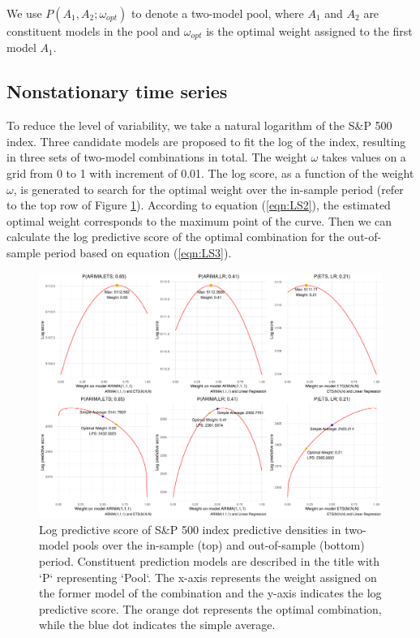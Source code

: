 \documentclass{monashthesis}
\begin{document}
We use \(P(A_1, A_2; \omega_{opt})\) to denote a two-model pool, where \(A_1\) and \(A_2\) are constituent models in the pool and \(\omega_{opt}\) is the optimal weight assigned to the first model \(A_1\).

\subsection*{Nonstationary time series}

To reduce the level of variability, we take a natural logarithm of the S\&P 500 index. Three candidate models are proposed to fit the log of the index, resulting in three sets of two-model combinations in total. The weight \(\omega\) takes values on a grid from 0 to 1 with increment of 0.01. The log score, as a function of the weight \(\omega\), is generated to search for the optimal weight over the in-sample period (refer to the top row of Figure \ref{fig:nonstat}). According to equation (\ref{eqn:LS2}), the estimated optimal weight corresponds to the maximum point of the curve. Then we can calculate the log predictive score of the optimal combination for the out-of-sample period based on equation (\ref{eqn:LS3}).

\begin{figure}[ht]
\centering
\includegraphics[scale=0.45]{figures/SP500_nonstationary.pdf}
\caption{Log predictive score of S\&P 500 index predictive densities in two-model pools over the in-sample (top) and out-of-sample (bottom) period. Constituent prediction models are described in the title with `P` representing `Pool`. The x-axis represents the weight assigned on the former model of the combination and the y-axis indicates the log predictive score. The orange dot represents the optimal combination, while the blue dot indicates the simple average.}
\label{fig:nonstat}
\end{figure}
\end{document}
